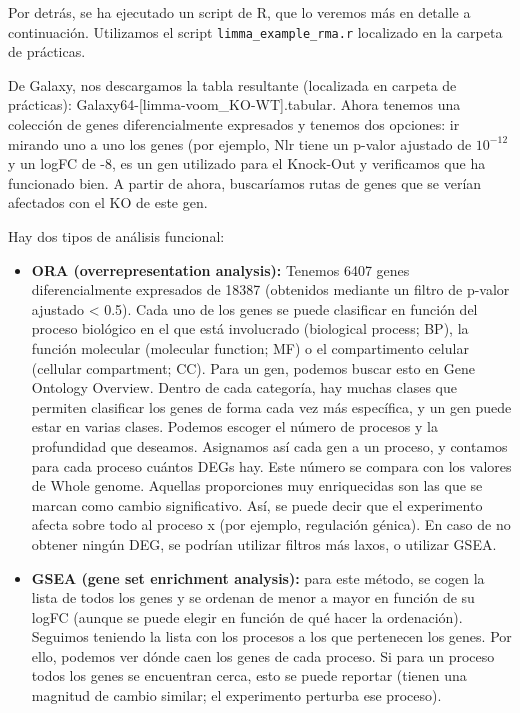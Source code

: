 Por detrás, se ha ejecutado un script de R, que lo veremos más en detalle a continuación. Utilizamos el script \texttt{limma\_example\_rma.r} localizado en la carpeta de prácticas. 

De Galaxy, nos descargamos la tabla resultante (localizada en carpeta de prácticas): Galaxy64-[limma-voom\_KO-WT].tabular. 
Ahora tenemos una colección de genes diferencialmente expresados y tenemos dos opciones: ir mirando uno a uno los genes (por ejemplo, Nlr tiene un p-valor ajustado de $10^{-12}$ y un logFC de -8, es un gen utilizado para el Knock-Out y verificamos que ha funcionado bien. A partir de ahora, buscaríamos rutas de genes que se verían afectados con el KO de este gen. 

Hay dos tipos de análisis funcional: 
\begin{itemize}
\item \textbf{ORA (overrepresentation analysis):} Tenemos 6407 genes diferencialmente expresados de 18387 (obtenidos mediante un filtro de p-valor ajustado < 0.5). Cada uno de los genes se puede clasificar en función del proceso biológico en el que está involucrado (biological process; BP), la función molecular (molecular function; MF) o el compartimento celular (cellular compartment; CC). Para un gen, podemos buscar esto en Gene Ontology Overview. Dentro de cada categoría, hay muchas clases que permiten clasificar los genes de forma cada vez más específica, y un gen puede estar en varias clases. Podemos escoger el número de procesos y la profundidad que deseamos. Asignamos así cada gen a un proceso, y contamos para cada proceso cuántos DEGs hay. Este número se compara con los valores de Whole genome. Aquellas proporciones muy enriquecidas son las que se marcan como cambio significativo. Así, se puede decir que el experimento afecta sobre todo al proceso x (por ejemplo, regulación génica). En caso de no obtener ningún DEG, se podrían utilizar filtros más laxos, o utilizar GSEA. 
\item \textbf{GSEA (gene set enrichment analysis):} para este método, se cogen la lista de todos los genes y se ordenan de menor a mayor en función de su logFC (aunque se puede elegir en función de qué hacer la ordenación). Seguimos teniendo la lista con los procesos a los que pertenecen los genes. Por ello, podemos ver dónde caen los genes de cada proceso. Si para un proceso todos los genes se encuentran cerca, esto se puede reportar (tienen una magnitud de cambio similar; el experimento perturba ese proceso). 
\end{itemize}
 
